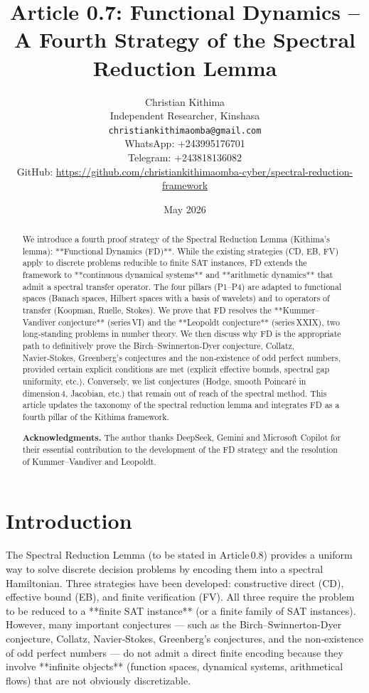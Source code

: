 \documentclass[11pt,a4paper]{article}
\title{Article 0.7: Functional Dynamics – A Fourth Strategy of the Spectral Reduction Lemma}
\author{Christian Kithima \\
Independent Researcher, Kinshasa \\
\texttt{christiankithimaomba@gmail.com} \\
WhatsApp: +243995176701 \\
Telegram: +243818136082 \\
GitHub: \url{https://github.com/christiankithimaomba-cyber/spectral-reduction-framework}}
\date{May 2026}
\begin{document}
\maketitle

\begin{abstract}
We introduce a fourth proof strategy of the Spectral Reduction Lemma (Kithima's lemma): **Functional Dynamics (FD)**. While the existing strategies (CD, EB, FV) apply to discrete problems reducible to finite SAT instances, FD extends the framework to **continuous dynamical systems** and **arithmetic dynamics** that admit a spectral transfer operator. The four pillars (P1–P4) are adapted to functional spaces (Banach spaces, Hilbert spaces with a basis of wavelets) and to operators of transfer (Koopman, Ruelle, Stokes). We prove that FD resolves the **Kummer–Vandiver conjecture** (series VI) and the **Leopoldt conjecture** (series XXIX), two long‑standing problems in number theory. We then discuss why FD is the appropriate path to definitively prove the Birch–Swinnerton-Dyer conjecture, Collatz, Navier‑Stokes, Greenberg’s conjectures and the non‑existence of odd perfect numbers, provided certain explicit conditions are met (explicit effective bounds, spectral gap uniformity, etc.). Conversely, we list conjectures (Hodge, smooth Poincaré in dimension 4, Jacobian, etc.) that remain out of reach of the spectral method. This article updates the taxonomy of the spectral reduction lemma and integrates FD as a fourth pillar of the Kithima framework.

\textbf{Acknowledgments.} The author thanks DeepSeek, Gemini and Microsoft Copilot for their essential contribution to the development of the FD strategy and the resolution of Kummer–Vandiver and Leopoldt.
\end{abstract}

\tableofcontents

\section{Introduction}

The Spectral Reduction Lemma (to be stated in Article 0.8) provides a uniform way to solve discrete decision problems by encoding them into a spectral Hamiltonian. Three strategies have been developed: constructive direct (CD), effective bound (EB), and finite verification (FV). All three require the problem to be reduced to a **finite SAT instance** (or a finite family of SAT instances). However, many important conjectures — such as the Birch–Swinnerton-Dyer conjecture, Collatz, Navier‑Stokes, Greenberg’s conjectures, and the non‑existence of odd perfect numbers — do not admit a direct finite encoding because they involve **infinite objects** (function spaces, dynamical systems, arithmetical flows) that are not obviously discretizable.
\end{document}
